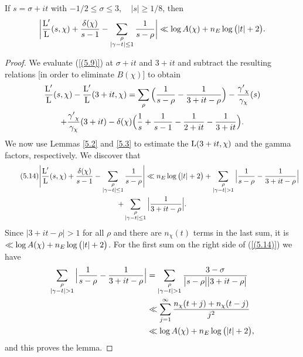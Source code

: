 \documentclass[./main]{subfiles}
\begin{document}
\begin{lemma}\label{5.6}
If $s=\sigma+it$ with $-1/2\leq\sigma\leq3,\quad|s|\geq1/8$, then
\[\bigg|\frac{\operatorname{L}'}{\operatorname{L}}(s,\chi) + \frac{\delta(\chi)}{s-1} - \sum_{\substack{\rho\\|\gamma-t|\leq1}}{\frac{1}{s-\rho}}\bigg|\ll\log{A(\chi)} + n_E\log{\big(|t|+2\big)}.
\]
\begin{proof}
We evaluate (\ref{(5.9)}) at $\sigma + it$ and $3+it$ and subtract the resulting relations [in order to eliminate $B(\chi)$] to obtain
\begin{multline*} \frac{\operatorname{L}'}{\operatorname{L}}(s,\chi) - \frac{\operatorname{L}'}{\operatorname{L}}(3+it,\chi) = \sum_{\rho}{\Big(\frac{1}{s-\rho}-\frac{1}{3+it-\rho}\Big)} - \frac{{\gamma'}_\chi}{\gamma_\chi}(s)\\ + \frac{{\gamma'}_\chi}{\gamma_\chi}(3+it) - \delta(\chi)\Big(\frac{1}{s}+\frac{1}{s-1}-\frac{1}{2+it}-\frac{1}{3+it}\Big).
\end{multline*}
We now use Lemmas \ref{5.2} and \ref{5.3} to estimate the $\operatorname{L}(3+it,\chi)$ and the gamma factors, respectively. We discover that
\begin{multline}\tag{5.14}\label{(5.14)}
\Bigg|\frac{\L'}{\L}(s,\chi) + \frac{\delta(\chi)}{s-1} - \sum_{\substack{\rho \\ |\gamma-t|\leq1}}{\frac{1}{s-\rho}}\Bigg|
\Vinogradov n_E\log{\big(|t|+2\big)} + \sum_{\substack{\rho\\|\gamma-t|>1}}{\Big|\frac{1}{s-\rho}-\frac{1}{3+it-\rho}\Big|} \\ + \sum_{\substack{\rho\\|\gamma-t|\leq1}}{\Big|\frac{1}{3+it-\rho}\Big|}.
\end{multline}
Since $|3+it-\rho|>1$ for all $\rho$ and there are $n_\chi(t)$ terms in the last sum, it is~$\ll\log{A(\chi)}+n_E\log{\big(|t|+2\big)}$. For the first sum on the right side of (\ref{(5.14)}) we have
\begin{align*}
    \sum_{\substack{\rho\\|\gamma-t|>1}}{\Big|\frac{1}{s-\rho}-\frac{1}{3+it-\rho}\Big|}& = \sum_{\substack{\rho\\|\gamma-t|>1}}{\frac{3-\sigma}{\big|s-\rho\big|\big|3+it-\rho\big|}} \\& \Vinogradov \sum_{j=1}^{\infty}{\frac{n_\chi(t+j) +n_\chi(t-j)}{j^2}} \\ &\Vinogradov \log{A(\chi)} + n_E\log{\big(|t|+2\big)},
\end{align*}
and this proves the lemma.
\end{proof}
\end{lemma}
\end{document}
